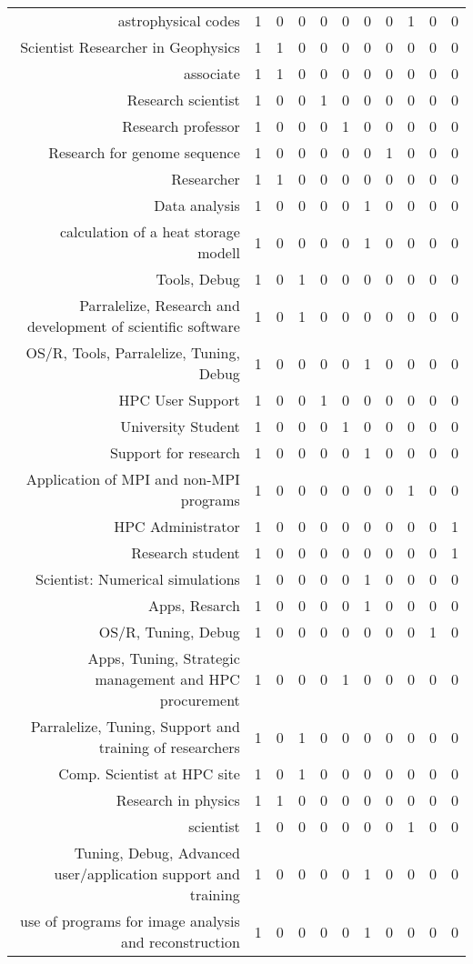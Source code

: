 {\begin{landscape}
\begin{longtable}[htb]{r|c|c|c|c|c|c|c|c|c|c}
{astrophysical codes} & 1 & 0 & 0 & 0 & 0 & 0 & 0 & 1 & 0 & 0 \\%
{Scientist Researcher in Geophysics} & 1 & 1 & 0 & 0 & 0 & 0 & 0 & 0 & 0 & 0 \\%
{associate} & 1 & 1 & 0 & 0 & 0 & 0 & 0 & 0 & 0 & 0 \\%
{Research scientist} & 1 & 0 & 0 & 1 & 0 & 0 & 0 & 0 & 0 & 0 \\%
{Research professor} & 1 & 0 & 0 & 0 & 1 & 0 & 0 & 0 & 0 & 0 \\%
{Research for genome sequence} & 1 & 0 & 0 & 0 & 0 & 0 & 1 & 0 & 0 & 0 \\%
{Researcher} & 1 & 1 & 0 & 0 & 0 & 0 & 0 & 0 & 0 & 0 \\%
{Data analysis} & 1 & 0 & 0 & 0 & 0 & 1 & 0 & 0 & 0 & 0 \\%
{calculation of a heat storage modell} & 1 & 0 & 0 & 0 & 0 & 1 & 0 & 0 & 0 & 0 \\%
{Tools, Debug} & 1 & 0 & 1 & 0 & 0 & 0 & 0 & 0 & 0 & 0 \\%
{Parralelize, Research and development of scientific software} & 1 & 0 & 1 & 0 & 0 & 0 & 0 & 0 & 0 & 0 \\%
{OS/R, Tools, Parralelize, Tuning, Debug} & 1 & 0 & 0 & 0 & 0 & 1 & 0 & 0 & 0 & 0 \\%
{HPC User Support} & 1 & 0 & 0 & 1 & 0 & 0 & 0 & 0 & 0 & 0 \\%
{University Student} & 1 & 0 & 0 & 0 & 1 & 0 & 0 & 0 & 0 & 0 \\%
{Support for research} & 1 & 0 & 0 & 0 & 0 & 1 & 0 & 0 & 0 & 0 \\%
{Application of MPI and non-MPI programs} & 1 & 0 & 0 & 0 & 0 & 0 & 0 & 1 & 0 & 0 \\%
{HPC Administrator} & 1 & 0 & 0 & 0 & 0 & 0 & 0 & 0 & 0 & 1 \\%
{Research student} & 1 & 0 & 0 & 0 & 0 & 0 & 0 & 0 & 0 & 1 \\%
{Scientist: Numerical simulations} & 1 & 0 & 0 & 0 & 0 & 1 & 0 & 0 & 0 & 0 \\%
{Apps, Resarch} & 1 & 0 & 0 & 0 & 0 & 1 & 0 & 0 & 0 & 0 \\%
{OS/R, Tuning, Debug} & 1 & 0 & 0 & 0 & 0 & 0 & 0 & 0 & 1 & 0 \\%
{Apps, Tuning, Strategic management and HPC procurement} & 1 & 0 & 0 & 0 & 1 & 0 & 0 & 0 & 0 & 0 \\%
{Parralelize, Tuning, Support and training of researchers} & 1 & 0 & 1 & 0 & 0 & 0 & 0 & 0 & 0 & 0 \\%
{Comp. Scientist at HPC site} & 1 & 0 & 1 & 0 & 0 & 0 & 0 & 0 & 0 & 0 \\%
{Research in physics} & 1 & 1 & 0 & 0 & 0 & 0 & 0 & 0 & 0 & 0 \\%
{scientist} & 1 & 0 & 0 & 0 & 0 & 0 & 0 & 1 & 0 & 0 \\%
{Tuning, Debug, Advanced user/application support and training} & 1 & 0 & 0 & 0 & 0 & 1 & 0 & 0 & 0 & 0 \\%
{use of programs for image analysis and reconstruction} & 1 & 0 & 0 & 0 & 0 & 1 & 0 & 0 & 0 & 0 \\%
\hline%
\end{longtable}%
\end{landscape}}%
\clearpage%
